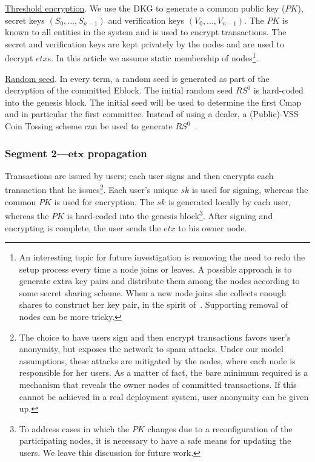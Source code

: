 \underline{Threshold encryption}. 
We use the DKG to generate a common public key ($PK$), secret keys $(S_0,...,S_{n-1})$ and verification keys $(V_0,...,V_{n-1})$. The $PK$ is known to all entities in the system and is used to encrypt transactions. The secret and verification keys are kept privately by the nodes and are used to decrypt $etx$s. In this article we assume static membership of nodes\footnote{An interesting topic for future investigation is removing the need to redo the setup process every time a node joins or leaves. A possible approach is to generate extra key pairs and distribute them among the nodes according to some secret sharing scheme. When a new node joins she collects enough shares to construct her key pair, in the spirit of~\cite{NoLeaderThersholdDK2001}. Supporting removal of nodes can be more tricky.}.

\underline{Random seed}. 
In every term, a random seed is generated as part of the decryption of the committed Eblock. The initial random seed $RS^0$  is hard-coded into the genesis block. The initial seed will be used to determine the first Cmap and in particular the first committee.
Instead of using a dealer, a (Public)-VSS Coin Tossing scheme can be used to generate $RS^0$~\cite{SCRAP}.

\subsubsection*{Segment 2---$\pmb{etx}$ propagation}
Transactions are issued by users; each user signs and then encrypts each transaction that he issues\footnote{The choice to have users sign and then encrypt transactions favors user's anonymity, but exposes the network to spam attacks. Under our model assumptions, these attacks are mitigated by the nodes, where each node is responsible for her users. As a matter of fact, the bare minimum required is a mechanism that reveals the owner nodes of committed transactions. If this cannot be achieved in a real deployment system, user anonymity can be given up.}. Each user’s unique $sk$ is used for signing, whereas the common $PK$ is used for encryption. The $sk$ is generated locally by each user, whereas the $PK$ is hard-coded into the genesis block\footnote{To address cases in which the $PK$ changes due to a reconfiguration of the participating nodes, it is necessary to have a safe means for updating the users. We leave this discussion for future work.}. After signing and encrypting is complete, the user sends the $etx$ to his owner node.

